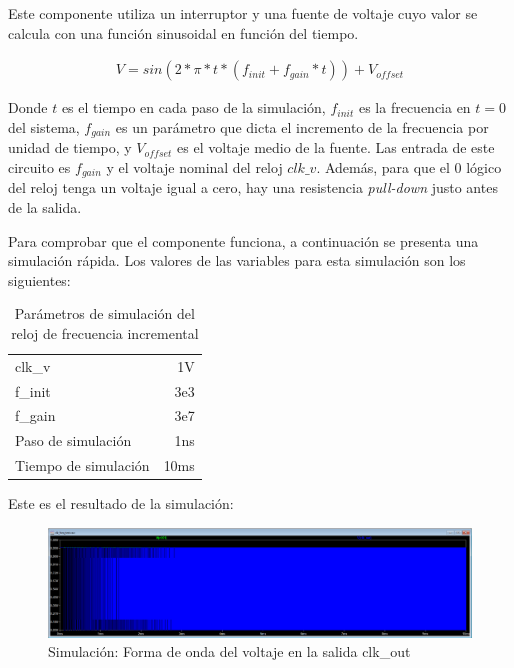 \documentclass[12pt]{report} %
\begin{document}
	Este componente utiliza un interruptor y una fuente de voltaje cuyo valor se calcula con una función sinusoidal en función del tiempo.
	\begin{figure}[H]
		\label{sw-capacities-v_eq}
		\begin{equation}
		\begin{array}{c}
		V=sin(2*\pi*t*(f_{init}+f_{gain}*t))+V_{offset}
		\end{array}
		\end{equation}
	\end{figure}
	
	Donde $t$ es el tiempo en cada paso de la simulación, $f_{init}$ es la frecuencia en $t=0$ del sistema, $f_{gain}$ es un parámetro que dicta el incremento de la frecuencia por unidad de tiempo, y $V_{offset}$ es el voltaje medio de la fuente. Las entrada de este circuito es $f_{gain}$ y el voltaje nominal del reloj $clk\_v$. Además, para que el 0 lógico del reloj tenga un voltaje igual a cero, hay una resistencia \textit{pull-down} justo antes de la salida.
	
	Para comprobar que el componente funciona, a continuación se presenta una simulación rápida. Los valores de las variables para esta simulación son los siguientes:
	\begin{table}[H]
		\label{tab:parameters-clk-freq-sim}
		\caption{Parámetros de simulación del reloj de frecuencia incremental}
		\begin{tabular}{lr}
			clk\_v & 1V \\
			f\_init & 3e3 \\
			f\_gain & 3e7 \\
			Paso de simulación & 1ns \\
			Tiempo de simulación & 10ms
		\end{tabular}
	\end{table}

	Este es el resultado de la simulación:
	
	\begin{figure}[H]
		\includegraphics[width=1\textwidth]{clk-freq-sim-waveform.PNG}
		\caption[Simulación: Forma de onda del voltaje en la salida clk\_out]{Simulación: Forma de onda del voltaje en la salida clk\_out}
		\label{fig:clk-freq-sim-waveform.PNG}
	\end{figure}
	
\end{document}
